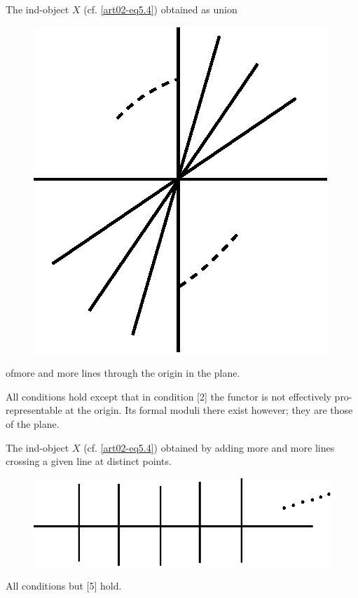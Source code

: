 \begin{example}\label{art02-exam5.9}
The ind-object $X$ (cf. \eqref{art02-eq5.4}) obtained as union
\begin{figure}[H]
\centering
\includegraphics{figure/fig3.eps}
\end{figure}
of\pageoriginale more and more lines through the origin in the plane.
\end{example}

All conditions hold except that in condition [2] the functor is not effectively pro-representable at the origin. Its formal moduli there exist however; they are those of the plane.

\begin{example}\label{art02-exam5.10}
The ind-object $X$ (cf. \eqref{art02-eq5.4}) obtained by adding more and more lines crossing a given line at distinct points.
\begin{figure}[H]
\centering
\includegraphics{figure/fig4.eps}
\end{figure}
All conditions but [5] hold.
\end{example}

